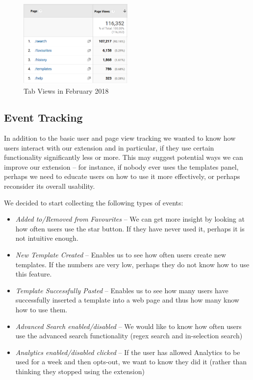 \documentclass[bsc,frontabs,twoside,singlespacing,parskip,deptreport]{infthesis}
\providecommand{\tightlist}{%
  \setlength{\itemsep}{0pt}\setlength{\parskip}{0pt}}
\begin{document}
\begin{figure}[h]
\centering
\includegraphics[width=0.5\textwidth]{../docs/tab-visits-feb-2018.png}
\caption{Tab Views in February 2018}
\end{figure}

\subsection{Event Tracking}
In addition to the basic user and page view tracking we wanted to know how users interact with our extension and in particular, if they use certain functionality significantly less or more. This may suggest potential ways we can improve our extension -- for instance, if nobody ever uses the templates panel, perhaps we need to educate users on how to use it more effectively, or perhaps reconsider its overall usability.

We decided to start collecting the following types of events:
\begin{itemize}
\tightlist
\item
  \textit{Added to/Removed from Favourites} -- We can get more insight by looking at how often users use the star button. If they have never used it, perhaps it is not intuitive enough.
\item
  \textit{New Template Created} -- Enables us to see how often users create new templates. If the numbers are very low, perhaps they do not know how to use this feature.
\item
  \textit{Template Successfully Pasted} -- Enables us to see how many users have successfully inserted a template into a web page and thus how many know how to use them.
\item
  \textit{Advanced Search enabled/disabled} -- We would like to know how often users use the advanced search functionality (regex search and in-selection search)
\item
  \textit{Analytics enabled/disabled clicked} -- If the user has allowed Analytics to be used for a week and then opts-out, we want to know they did it (rather than thinking they stopped using the extension)
\end{itemize}
\end{document}
